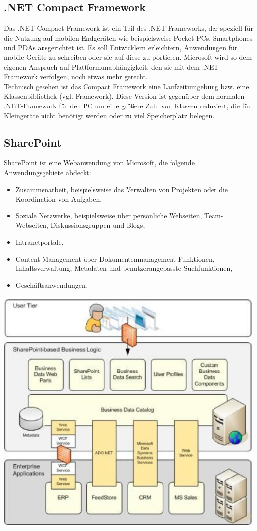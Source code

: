 \documentclass[10pt]{article}
\begin{document}
\subsection{.NET Compact Framework}
Das .NET Compact Framework ist ein Teil des .NET-Frameworks, der speziell für die Nutzung auf mobilen Endgeräten wie beispielsweise Pocket-PCs, Smartphones und PDAs ausgerichtet ist. Es soll Entwicklern erleichtern, Anwendungen für mobile Geräte zu schreiben oder sie auf diese zu portieren. Microsoft wird so dem eigenen Anspruch auf Plattformunabhängigkeit, den sie mit dem .NET Framework verfolgen, noch etwas mehr gerecht. \\
Technisch gesehen ist das Compact Framework eine Laufzeitumgebung bzw. eine Klassenbibliothek (vgl. Framework). Diese Version ist gegenüber dem normalen .NET-Framework für den PC um eine größere Zahl von Klassen reduziert, die für Kleingeräte nicht benötigt werden oder zu viel Speicherplatz belegen.

\subsection{SharePoint}
SharePoint ist eine Webanwendung von Microsoft, die folgende Anwendungsgebiete abdeckt:
\begin{itemize}
	\item Zusammenarbeit, beispielsweise das Verwalten von Projekten oder die Koordination von Aufgaben,
	\item Soziale Netzwerke, beispielsweise über persönliche Webseiten, Team-Webseiten, Diskussionsgruppen und Blogs,
	\item Intranetportale,
	\item Content-Management über Dokumentenmanagement-Funktionen, Inhaltsverwaltung, Metadaten und benutzerangepasste Suchfunktionen,
	\item Geschäftsanwendungen.
\end{itemize}
\begin{center}
	\includegraphics[scale=0.4]{sharepoint.png}
\end{center}
\end{document}
